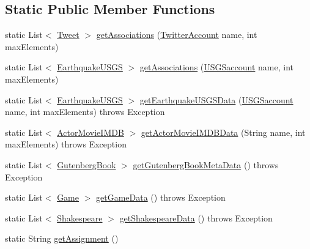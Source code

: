 \subsection*{Static Public Member Functions}
\begin{DoxyCompactItemize}
\item 
static List$<$ \hyperlink{classbridges_1_1data__src__dependent_1_1_tweet}{Tweet} $>$ \hyperlink{classbridges_1_1connect_1_1_bridges_ad8f145f95222730fad3c0628b42f0128}{get\+Associations} (\hyperlink{classbridges_1_1data__src__dependent_1_1_twitter_account}{Twitter\+Account} name, int max\+Elements)
\item 
static List$<$ \hyperlink{classbridges_1_1data__src__dependent_1_1_earthquake_u_s_g_s}{Earthquake\+U\+S\+GS} $>$ \hyperlink{classbridges_1_1connect_1_1_bridges_ac02211d6205c1270df11fcc271982d40}{get\+Associations} (\hyperlink{classbridges_1_1data__src__dependent_1_1_u_s_g_saccount}{U\+S\+G\+Saccount} name, int max\+Elements)
\item 
static List$<$ \hyperlink{classbridges_1_1data__src__dependent_1_1_earthquake_u_s_g_s}{Earthquake\+U\+S\+GS} $>$ \hyperlink{classbridges_1_1connect_1_1_bridges_afd68bf25a3f61e731f603da67fbdcecc}{get\+Earthquake\+U\+S\+G\+S\+Data} (\hyperlink{classbridges_1_1data__src__dependent_1_1_u_s_g_saccount}{U\+S\+G\+Saccount} name, int max\+Elements)  throws Exception 
\item 
static List$<$ \hyperlink{classbridges_1_1data__src__dependent_1_1_actor_movie_i_m_d_b}{Actor\+Movie\+I\+M\+DB} $>$ \hyperlink{classbridges_1_1connect_1_1_bridges_a30338703da622d677b9ac4f83f8d4200}{get\+Actor\+Movie\+I\+M\+D\+B\+Data} (String name, int max\+Elements)  throws Exception 
\item 
static List$<$ \hyperlink{classbridges_1_1data__src__dependent_1_1_gutenberg_book}{Gutenberg\+Book} $>$ \hyperlink{classbridges_1_1connect_1_1_bridges_a123d445316be7e9927b5642a3b8c71ba}{get\+Gutenberg\+Book\+Meta\+Data} ()  throws Exception
\item 
static List$<$ \hyperlink{classbridges_1_1data__src__dependent_1_1_game}{Game} $>$ \hyperlink{classbridges_1_1connect_1_1_bridges_abcd1c3465d8963cd635a63e248f33525}{get\+Game\+Data} ()  throws Exception 
\item 
static List$<$ \hyperlink{classbridges_1_1data__src__dependent_1_1_shakespeare}{Shakespeare} $>$ \hyperlink{classbridges_1_1connect_1_1_bridges_a03ba87a09742cfb40f357253239006e6}{get\+Shakespeare\+Data} ()  throws Exception 
\item 
static String \hyperlink{classbridges_1_1connect_1_1_bridges_ae488b9bf0d696adb7f5a6ba7ce4ff2fd}{get\+Assignment} ()

\end{DoxyCompactItemize}
